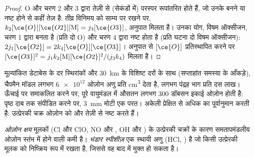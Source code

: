 \begin{proof}
O और  चरण 2 और 3 द्वारा तेज़ी से (सेकंडों में) परस्पर रूपांतरित होते हैं, जो
उनके बनने या नष्ट होने से कहीं तेज़ है: तीव्र विनिमय को साम्य पर रखने पर,
$k_2[\ce{O}][\ce{O2}][\mathrm M] = j_3[\ce{O3}]$, अनुपात मिलता है। उनका योग, विषम ऑक्सीजन, चरण 1 द्वारा
बनता है (प्रति  दो O) और चरण 4 द्वारा नष्ट होता है (प्रति घटना दो विषम ऑक्सीजन):
$2j_1[\ce{O2}] = 2k_4[\ce{O}][\ce{O3}]$। अनुपात से $[\ce{O}]$ प्रतिस्थापित करने पर $[\ce{O3}]^2 = j_1k_2[\mathrm M][\ce{O2}]^2/(j_3k_4)$ मिलता है।
\end{proof}

मूल्यांकित डेटाबेस के दर स्थिरांकों और \qty{30}{km} के विशिष्ट  दरों के साथ
(सप्ताहांत समस्या के आँकड़े), चैपमैन मॉडल लगभग
$\num{6e12}$ ओज़ोन अणु प्रति \unit{cm^3} देता है, लगभग पंद्रह भाग प्रति दस लाख। ऊँचाई पर
समाकलित करने पर, पूरे वायुमंडल में औसतन लगभग 300 डॉबसन इकाई ओज़ोन होती है:
पृष्ठ दाब तक संपीडित करने पर, \qty{3}{mm} मोटी एक परत। अकेली 
प्रेक्षित से अधिक का पूर्वानुमान करती है: उत्प्रेरकी चक्र ओज़ोन को और तेज़ी से नष्ट करते हैं।

\begin{definition}[ओज़ोन क्षय, भंडार स्पीशीज़]\label{def:b3:photochemistry:ozone-depletion}
\emph{ओज़ोन क्षय} मूलकों (Cl और ClO,
NO और , OH और ) के उत्प्रेरकी चक्रों के कारण समतापमंडलीय ओज़ोन स्तंभ में होने वाली
कमी है। \emph{भंडार स्पीशीज़}
एक स्थायी अणु (HCl, ) है जो किसी उत्प्रेरकी मूलक को निष्क्रिय
रूप में रखता है, जिससे वह बाद में मुक्त हो सकता है।
\end{definition}

